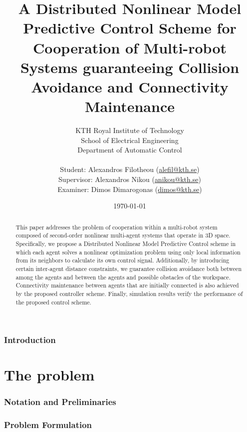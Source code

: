 \documentclass[a4paper,12pt,twoside]{article}
\title{\textbf{A Distributed Nonlinear Model Predictive Control Scheme for
Cooperation of Multi-robot Systems guaranteeing Collision Avoidance and
Connectivity Maintenance}}
\author{KTH Royal Institute of Technology \\
  School of Electrical Engineering \\
  Department of Automatic Control \\ \\
Student: Alexandros Filotheou (\href{mailto: alefil@kth.se}{alefil@kth.se}) \\
Supervisor: Alexandros Nikou (\href{mailto: anikou@kth.se}{anikou@kth.se}) \\
Examiner: Dimos Dimarogonas (\href{mailto: dimos@kth.se}{dimos@kth.se}) \\}
\date{\today}
\begin{document}
\maketitle

\begin{abstract}
	This paper addresses the problem of cooperation within a multi-robot
  system composed of second-order nonlinear multi-agent systems that operate
  in $3$D space. Specifically, we propose a Distributed Nonlinear Model
  Predictive Control scheme in which each agent solves a nonlinear optimization
  problem using only local information from its neighbors to calculate its own
  control signal. Additionally, by introducing certain
  inter-agent distance constraints, we guarantee collision avoidance both
  between among the agents and between the agents and possible obstacles of the
  workspace. Connectivity maintenance between agents that are initially
  connected is also achieved by the proposed controller scheme. Finally,
  simulation results verify the  performance of the proposed control scheme.
\end{abstract}

\cleardoublepage
\tableofcontents
\cleardoublepage


\section{Introduction}

  
  \cleardoublepage

\part{The problem}
\cleardoublepage

  \section{Notation and Preliminaries}
    \label{sec:notation_reliminaries}

    
    
    
    \cleardoublepage


  \section{Problem Formulation}
    \label{sec:prob_formulation}
\end{document}
